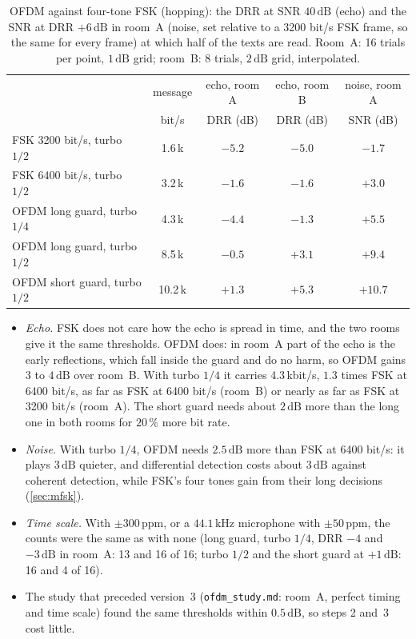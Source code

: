 \documentclass[11pt,a4paper]{article}
\newcommand{\kHz}{\,\mathrm{kHz}}
\newcommand{\dB}{\,\mathrm{dB}}
\newcommand{\code}[1]{\texttt{#1}}
\theoremstyle{remark}
\begin{document}
\begin{table}[ht]
\centering
\caption{OFDM against four-tone FSK (hopping): the DRR at SNR $40\dB$ (echo) and the SNR at DRR $+6\dB$ in room~A (noise, set relative to a 3200 bit/s FSK frame, so the same for every frame) at which half of the texts are read. Room~A: 16 trials per point, $1\dB$ grid; room~B: 8 trials, $2\dB$ grid, interpolated.}
\label{tab:ofdmres}
\small
\begin{tabular}{lcccc}
\toprule
& message & echo, room A & echo, room B & noise, room A\\
& bit/s & DRR (dB) & DRR (dB) & SNR (dB)\\
\midrule
FSK 3200 bit/s, turbo $1/2$ & 1.6\,k & $-5.2$ & $-5.0$ & $-1.7$\\
FSK 6400 bit/s, turbo $1/2$ & 3.2\,k & $-1.6$ & $-1.6$ & $+3.0$\\
OFDM long guard, turbo $1/4$ & 4.3\,k & $-4.4$ & $-1.3$ & $+5.5$\\
OFDM long guard, turbo $1/2$ & 8.5\,k & $-0.5$ & $+3.1$ & $+9.4$\\
OFDM short guard, turbo $1/2$ & 10.2\,k & $+1.3$ & $+5.3$ & $+10.7$\\
\bottomrule
\end{tabular}
\end{table}

\begin{itemize}
\item \emph{Echo.} FSK does not care how the echo is spread in time, and the two rooms give it the same thresholds. OFDM does: in room~A part of the echo is the early reflections, which fall inside the guard and do no harm, so OFDM gains 3 to $4\dB$ over room~B. With turbo $1/4$ it carries 4.3\,kbit/s, $1.3$ times FSK at 6400 bit/s, as far as FSK at 6400 bit/s (room~B) or nearly as far as FSK at 3200 bit/s (room~A). The short guard needs about $2\dB$ more than the long one in both rooms for $20\,\%$ more bit rate.
\item \emph{Noise.} With turbo $1/4$, OFDM needs $2.5\dB$ more than FSK at 6400 bit/s: it plays $3\dB$ quieter, and differential detection costs about $3\dB$ against coherent detection, while FSK's four tones gain from their long decisions (\cref{sec:mfsk}).
\item \emph{Time scale.} With $\pm 300$\,ppm, or a $44.1\kHz$ microphone with $\pm 50$\,ppm, the counts were the same as with none (long guard, turbo $1/4$, DRR $-4$ and $-3\dB$ in room~A: 13 and 16 of 16; turbo $1/2$ and the short guard at $+1\dB$: 16 and 4 of 16).
\item The study that preceded version~3 (\code{ofdm\_study.md}: room~A, perfect timing and time scale) found the same thresholds within $0.5\dB$, so steps 2 and~3 cost little.
\end{itemize}
\end{document}
